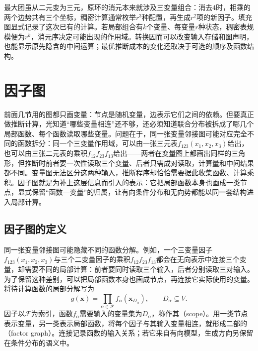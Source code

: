 最大团虽从二元变为三元，原环的消元本来就涉及三变量组合：消去$4$时，相乘的两个边势共有三个坐标，稠密计算通常枚举$r^3$种配置，再生成$r^2$项的新因子。填充图显式记录了这次已有的计算。若局部组合有$k$个变量、每变量$r$种状态，稠密表规模便为$r^k$，消元序决定可能出现的作用域。转换因而可以改变输入存储和图声明，也能显示原先隐含的中间运算；最优推断成本的变化还取决于可选的顺序及函数结构。

\section{因子图}
\label{sec:pgm-representations-factor-graphs}

前面几节用的图都只画变量：节点是随机变量，边表示它们之间的依赖。但要真正做推断计算，光知道“哪些变量相连”还不够，还必须知道联合分布被拆成了哪几个局部函数、每个函数读取哪些变量。问题在于，同一张变量邻接图可能对应完全不同的函数拆分：同一个三变量作用域，可以由一张三元表$f_{123}(x_1,x_2,x_3)$给出，也可以由三张二元表的乘积$f_{12}f_{23}f_{13}$给出——两者在变量图上都画出同样的三角形，但推断时前者要一次性读取三个变量、后者只需成对读取，计算量和中间结果都不同。变量图无法区分这两种输入，推断程序却恰恰需要据此收集函数、计算乘积。因子图就是为补上这层信息而引入的表示：它把局部函数本身也画成一类节点，显式保留“函数—变量”的归属，让有向条件分布和无向势都能以同一套结构进入局部计算。

\subsection{因子图的定义}
\label{sec:pgm-representations-factor-graph-definition}

同一张变量邻接图可能隐藏不同的函数分解。例如，一个三变量因子$f_{123}(x_1,x_2,x_3)$与三个二变量因子的乘积$f_{12}f_{23}f_{13}$都会在无向表示中连接三个变量，却需要不同的局部计算：前者要同时读取三个输入，后者分别读取三对输入。为了保留这种差别，可以把局部函数本身也画成节点，再连接它实际使用的变量。将待计算函数的局部分解写为
\begin{equation}
  g(\bm{x})=\prod_{\alpha\in\mathcal{F}}
  f_\alpha(\bm{x}_{D_\alpha}),
  \qquad D_\alpha\subseteq V.
  \label{eq:pgm-representations-factor-graph-product}
\end{equation}
因子以$\mathcal{F}$为索引，函数$f_\alpha$需要输入的变量集为$D_\alpha$，称作其（scope）。用一类节点表示变量，另一类表示局部函数，将每个因子与其输入变量相连，就形成二部的（factor graph）。连接记录函数的输入关系；若它来自有向模型，生成方向另保留在条件分布的语义中。

